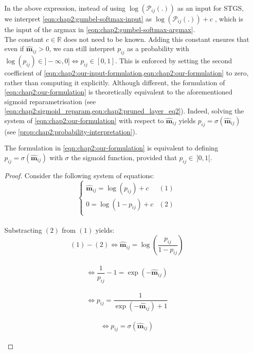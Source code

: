 \noindent In the above expression, instead of using $\log(\mathcal{P}_{ij}(.))$
as an input for \ac{STGS}, we interpret \cref{eqn:chap2:gumbel-softmax-input} as
$\log(\mathcal{P}_{ij}(.)) + c$ , which is the input of the argmax in
\cref{eqn:chap2:gumbel-softmax-argmax}.\\

The constant $c \in \mathds{R}$ does not need to be known. Adding this constant
ensures that even if $\bm{\hat{m}}_{ij} > 0$, we can still interpret $p_{ij}$ as
a probability with $\log(p_{ij}) \in ]-\infty,0] \Leftrightarrow p_{ij} \in
[0,1]$. This is enforced by setting the second coefficient of
\cref{eqn:chap2:our-input-formulation,eqn:chap2:our-formulation}  to zero,
rather than computing it explicitly. Although different, the formulation of
\cref{eqn:chap2:our-formulation} is theoretically equivalent to the
aforementioned sigmoid reparametrisation (see
\cref{eqn:chap2:sigmoid_reparam,eqn:chap2:pruned_layer_eq2}). Indeed, solving
the system of \cref{eqn:chap2:our-formulation} with respect to
$\bm{\hat{m}}_{ij}$ yields $p_{ij} = \sigma(\bm{\hat{m}}_{ij})$ (see
\cref{prop:chap2:probability-interpretation}). \\

\begin{proposition}
  \label{prop:chap2:probability-interpretation}
  The formulation in \cref{eqn:chap2:our-formulation} is equivalent to defining
  $p_{ij} = \sigma(\bm{\hat{m}}_{ij})$ with $\sigma$ the sigmoid function,
  provided that $p_{ij}\in ~ ]0,1[$.
\end{proposition}
\vspace*{\baselineskip}

\begin{proof}
  Consider the following system of equations:\\
  $$
    \left\{
    \begin{array}{ll}
      \bm{\hat{m}}_{ij} = \log(p_{ij})+c & (1) \\
      0 = \log(1-p_{ij})+c               & (2) \\
    \end{array}
    \right.
  $$\\
  Substracting $(2)$ from $(1)$ yields:\\
  $$ (1) - (2) \Leftrightarrow \bm{\hat{m}}_{ij} = \displaystyle\log\left( \frac{p_{ij}}{1 - p_{ij}} \right)$$\\
  $$ \Leftrightarrow \frac{1}{p_{ij}} - 1 = \exp(-\bm{\hat{m}}_{ij})$$\\
  $$ \Leftrightarrow p_{ij} = \frac{1}{\exp(-\bm{\hat{m}}_{ij}) + 1}$$\\
  $$ \Leftrightarrow p_{ij} = \sigma(\bm{\hat{m}}_{ij})$$\\

\end{proof}


